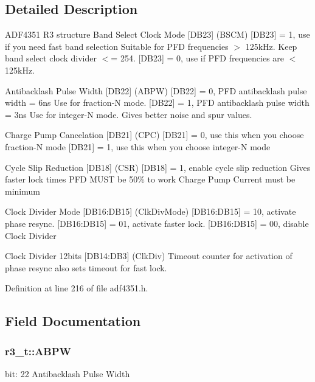 \subsection{Detailed Description}
A\+D\+F4351 R3 structure Band Select Clock Mode \mbox{[}D\+B23\mbox{]} (B\+S\+CM) \mbox{[}D\+B23\mbox{]} = 1, use if you need fast band selection Suitable for P\+FD frequencies $>$ 125k\+Hz. Keep band select clock divider $<$= 254. \mbox{[}D\+B23\mbox{]} = 0, use if P\+FD frequencies are $<$ 125k\+Hz. 

Antibacklash Pulse Width \mbox{[}D\+B22\mbox{]} (A\+B\+PW) \mbox{[}D\+B22\mbox{]} = 0, P\+FD antibacklash pulse width = 6ns Use for fraction-\/N mode. \mbox{[}D\+B22\mbox{]} = 1, P\+FD antibacklash pulse width = 3ns Use for integer-\/N mode. Gives better noise and spur values.

Charge Pump Cancelation \mbox{[}D\+B21\mbox{]} (C\+PC) \mbox{[}D\+B21\mbox{]} = 0, use this when you choose fraction-\/N mode \mbox{[}D\+B21\mbox{]} = 1, use this when you choose integer-\/N mode

Cycle Slip Reduction \mbox{[}D\+B18\mbox{]} (C\+SR) \mbox{[}D\+B18\mbox{]} = 1, enable cycle slip reduction Gives faster lock times P\+FD M\+U\+ST be 50\% to work Charge Pump Current must be minimum

Clock Divider Mode \mbox{[}D\+B16\+:D\+B15\mbox{]} (Clk\+Div\+Mode) \mbox{[}D\+B16\+:D\+B15\mbox{]} = 10, activate phase resync. \mbox{[}D\+B16\+:D\+B15\mbox{]} = 01, activate faster lock. \mbox{[}D\+B16\+:D\+B15\mbox{]} = 00, disable Clock Divider

Clock Divider 12bits \mbox{[}D\+B14\+:D\+B3\mbox{]} (Clk\+Div) Timeout counter for activation of phase resync also sets timeout for fast lock. 

Definition at line 216 of file adf4351.\+h.



\subsection{Field Documentation}
\subsubsection[{\texorpdfstring{A\+B\+PW}{ABPW}}]{ r3\+\_\+t\+::\+A\+B\+PW}\hypertarget{structr3__t_a5f81f8e2e2dedd4c4b7d939e51ae2c4c}{}\label{structr3__t_a5f81f8e2e2dedd4c4b7d939e51ae2c4c}
bit\+: 22 Antibacklash Pulse Width 

